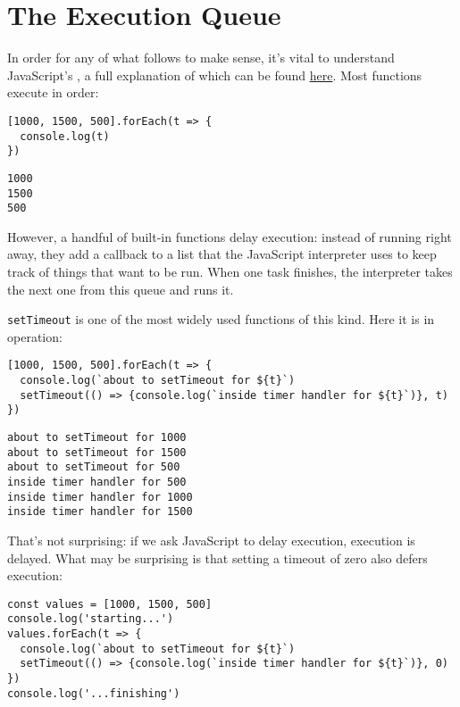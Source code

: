 \section{The Execution Queue}\label{s:promises-queue}

In order for any of what follows to make sense,
it's vital to understand JavaScript's ,
a full explanation of which can be found \href{https://nodejs.org/en/docs/guides/event-loop-timers-and-nexttick/}{here}.
Most functions execute in order:

\begin{verbatim}
[1000, 1500, 500].forEach(t => {
  console.log(t)
})
\end{verbatim}

\begin{verbatim}
1000
1500
500
\end{verbatim}

However,
a handful of built-in functions delay execution:
instead of running right away,
they add a callback to a list that the JavaScript interpreter uses
to keep track of things that want to be run.
When one task finishes,
the interpreter takes the next one from this queue and runs it.

\texttt{setTimeout} is one of the most widely used functions of this kind.
Here it is in operation:

\begin{verbatim}
[1000, 1500, 500].forEach(t => {
  console.log(`about to setTimeout for ${t}`)
  setTimeout(() => {console.log(`inside timer handler for ${t}`)}, t)
})
\end{verbatim}

\begin{verbatim}
about to setTimeout for 1000
about to setTimeout for 1500
about to setTimeout for 500
inside timer handler for 500
inside timer handler for 1000
inside timer handler for 1500
\end{verbatim}

That's not surprising:
if we ask JavaScript to delay execution,
execution is delayed.
What may be surprising is that setting a timeout of zero also defers execution:

\begin{verbatim}
const values = [1000, 1500, 500]
console.log('starting...')
values.forEach(t => {
  console.log(`about to setTimeout for ${t}`)
  setTimeout(() => {console.log(`inside timer handler for ${t}`)}, 0)
})
console.log('...finishing')
\end{verbatim}

